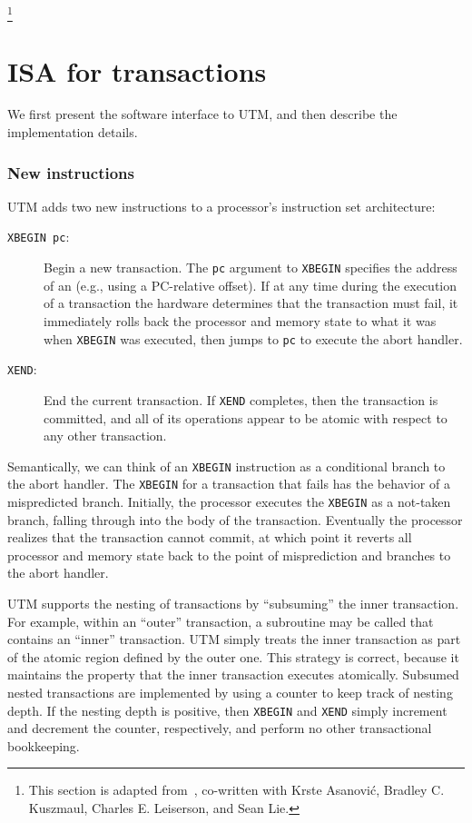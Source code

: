 \footnote{This section is adapted from~\cite{AnanianAsKuLi04},
co-written with Krste Asanovi\'c, Bradley C. Kuszmaul, Charles
E. Leiserson, and Sean Lie.}

\section{ISA for transactions}\label{sec:isa}
  We first present the
software interface to UTM, and then describe the implementation
details.

\subsubsection{New instructions}

UTM adds two new instructions to a processor's instruction set
architecture:
\begin{description}
\item[\texttt{XBEGIN pc}:] Begin a new transaction.  The
\texttt{pc} argument to \texttt{XBEGIN} specifies
the address of an  (e.g., using a PC-relative offset).
If at any time during the execution of a transaction the hardware determines
that the transaction must fail, it immediately rolls back the
processor and memory state to what it was when \texttt{XBEGIN} was
executed, then jumps to \texttt{pc} to execute the abort handler.
 
\item[\texttt{XEND}:] End the current transaction.  If \texttt{XEND}
completes, then the transaction is committed, and all of its
operations appear to be atomic with respect to any other transaction.
\end{description}

Semantically, we can think of an \texttt{XBEGIN} instruction as a
conditional branch to the abort handler.  The \texttt{XBEGIN} for a
transaction that fails has the behavior of a mispredicted branch.
Initially, the processor executes the \texttt{XBEGIN} as a not-taken
branch, falling through into the body of the transaction.  Eventually
the processor realizes that the transaction cannot commit, at which
point it reverts all processor and memory state back to the point of
misprediction and branches to the abort handler.

UTM supports the nesting of transactions by ``subsuming'' the inner
transaction.  For example, within an ``outer'' transaction, a
subroutine may be called that contains an ``inner'' transaction.
UTM simply treats the inner transaction as part of the atomic
region defined by the outer one.  This strategy is correct, because it
maintains the property that the inner transaction executes atomically.
Subsumed nested transactions are implemented by using a counter to
keep track of nesting depth.  If the nesting depth is positive, then
\texttt{XBEGIN} and \texttt{XEND} simply increment and decrement the
counter, respectively, and perform no other transactional bookkeeping.


